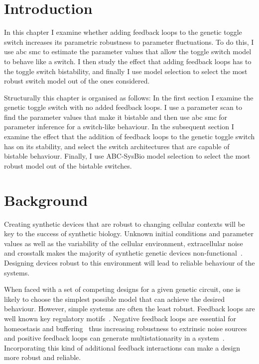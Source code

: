 \section{Introduction}

In this chapter I examine whether adding feedback loops to the genetic toggle switch increases its parametric robustness to parameter fluctuations. To do this, I use \acrshort{abc} \acrshort{smc} to estimate the parameter values that allow the toggle switch model to behave like a switch.  I then study the effect that adding feedback loops has to the toggle switch bistability, and finally I use model selection to select the most robust switch model out of the ones considered.

Structurally this chapter is organised as follows: In the first section I examine the genetic toggle switch with no added feedback loops. I use a parameter scan to find the parameter values that make it bistable and then use \acrshort{abc} \acrshort{smc} for parameter inference for a switch-like behaviour. In the subsequent section I examine the effect that the addition of feedback loops to the genetic toggle switch has on its stability, and select the switch architectures that are capable of bistable behaviour. Finally, I use ABC-SysBio model selection to select the most robust model out of the bistable switches.


\section{Background}


Creating synthetic devices that are robust to changing cellular contexts will be key to the success of synthetic biology. Unknown initial conditions and parameter values as well as the variability of the cellular environment, extracellular noise and crosstalk makes the majority of synthetic genetic devices non-functional~\autocite{Chen:2009ea}. Designing devices robust to this environment will lead to reliable behaviour of the systems.

When faced with a set of competing designs for a given genetic circuit, one is likely to choose the simplest possible model that can achieve the desired behaviour. However, simple systems are often the least robust. Feedback loops are well known key regulatory motifs~\autocite{Brandman:2005ci}. Negative feedback loops are essential for homeostasis and buffering~\autocite{Thomas:1995id} thus increasing robustness to extrinsic noise sources and positive feedback loops can generate multistationarity in a system~\autocite{Thomas:1995id}. Incorporating this kind of additional feedback interactions can make a design more robust and reliable. 

